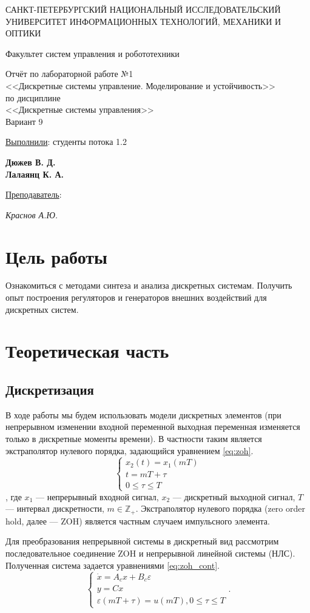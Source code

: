 \documentclass[a4paper, 14pt]{extarticle}
\theoremstyle{definition}
\theoremstyle{plain}
\theoremstyle{remark}
\newcommand*{\titlePage}{
	\thispagestyle{title}
	\begingroup
	\begin{center}
		\vspace*{3ex}
		{\small
			САНКТ-ПЕТЕРБУРГСКИЙ НАЦИОНАЛЬНЫЙ ИССЛЕДОВАТЕЛЬСКИЙ УНИВЕРСИТЕТ ИНФОРМАЦИОННЫХ ТЕХНОЛОГИЙ, МЕХАНИКИ И ОПТИКИ	
		}
		
		\vspace*{2ex}
		
		{\normalsize
			Факультет систем управления и робототехники
		}
		
		\vspace*{15ex}
		
		{
			Отчёт по лабораторной работе №1\\
			<<Дискретные системы управление. Моделирование и устойчивость>>\\
			по дисциплине\\
			<<Дискретные системы управления>>\\
				Вариант 9
			
		}
		
	\end{center}
	\vspace*{10ex}
	\begin{flushright}
		{\large 
			\underline{Выполнили}: студенты потока 1.2 \\
			\begin{flushright}
				\textbf{Дюжев В. Д.}\\
				\textbf{Лалаянц К. А.}\\
			\end{flushright}
		}
		\vspace*{5ex}
		{\large 
			\underline{Преподаватель}:\\ 
			\begin{flushright}
            \textit{Краснов А.Ю.}
			\end{flushright}
		}
	\end{flushright}	
	\newpage
	\setcounter{page}{1}
	\endgroup}
\begin{document}
\renewcommand{\contentsname}{\hfillОГЛАВЛЕНИЕ\hfill} 
\titlePage
\thispagestyle{plain}
\tableofcontents
\pagestyle{style}

\newpage
\setcounter{page}{1}

% 

\section{Цель работы}
Ознакомиться с методами синтеза и анализа дискретных системам. Получить опыт построения регуляторов и генераторов внешних воздействий для дискретных систем.

\section{Теоретическая часть}
\subsection{Дискретизация}
В ходе работы мы будем использовать модели дискретных элементов (при непрерывном изменении входной переменной выходная переменная изменяется только в
дискретные моменты времени). В частности таким является экстраполятор нулевого порядка, задающийся уравнением \ref{eq:zoh}.
\begin{equation}\label{eq:zoh}
	\begin{cases}
		x_2(t) = x_1(mT) \\
		t = mT + \tau \\ 0\le\tau\le T
	\end{cases}
\end{equation}
, где $x_1$ --- непрерывный входной сигнал, $x_2$ --- дискретный выходной сигнал, $T$ --- интервал дискретности, $m \in \mathbb{Z}_+$. Экстраполятор нулевого порядка (zero order hold, далее --- ZOH) является частным случаем импульсного элемента.

Для преобразования непрерывной системы в дискретный вид рассмотрим последовательное соединение ZOH и непрерывной линейной системы (НЛС). Полученная система задается уравнениями \ref{eq:zoh_cont}.
\begin{equation}\label{eq:zoh_cont}
	\begin{cases}
		\dot{x} = A_cx + B_c\varepsilon \\
		y = Cx \\
		\varepsilon(mT + \tau) = u(mT), 0\le\tau\le T
	\end{cases}.
\end{equation}
\end{document}
